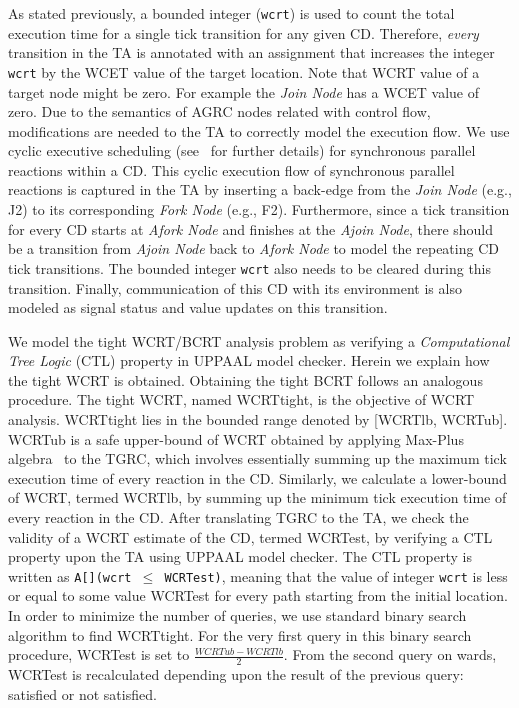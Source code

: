 As stated previously, a bounded integer (\texttt{wcrt}) is used to count
the total execution time for a single tick transition for any given
CD. Therefore, \textit{every} transition in the TA is annotated with an
assignment that increases the integer \texttt{wcrt} by the WCET value of
the target location. Note that WCRT value of a target node might be
zero. For example the \textit{Join Node} has a WCET value of zero. Due
to the semantics of AGRC nodes related with control flow, modifications
are needed to the TA to correctly model the execution flow. We use
cyclic executive scheduling (see~\cite{amal10} for further details) for
synchronous parallel reactions within a CD. This cyclic execution flow
of synchronous parallel reactions is captured in the TA by inserting a
back-edge from the \textit{Join Node} (e.g., J2) to its corresponding
\textit{Fork Node} (e.g., F2). Furthermore, since a tick transition for
every CD starts at \textit{Afork Node} and finishes at the \textit{Ajoin
  Node}, there should be a transition from \textit{Ajoin Node} back to
\textit{Afork Node} to model the repeating CD tick transitions. The
bounded integer \texttt{wcrt} also needs to be cleared during this
transition. Finally, communication of this CD with its environment is
also modeled as signal status and value updates on this transition.

We model the tight WCRT/BCRT analysis problem as verifying a
\textit{Computational Tree Logic} (CTL) property in UPPAAL model
checker. Herein we explain how the tight WCRT is obtained. Obtaining the
tight BCRT follows an analogous procedure. The tight WCRT, named
WCRTtight, is the objective of WCRT analysis. WCRTtight lies in the
bounded range denoted by [WCRTlb, WCRTub]. WCRTub is a safe upper-bound
of WCRT obtained by applying Max-Plus algebra~\cite{boldt07} to the
TGRC, which involves essentially summing up the maximum tick execution
time of every reaction in the CD. Similarly, we calculate a lower-bound
of WCRT, termed WCRTlb, by summing up the minimum tick execution time of
every reaction in the CD. After translating TGRC to the TA, we check the
validity of a WCRT estimate of the CD, termed WCRTest, by verifying a
CTL property upon the TA using UPPAAL model checker. The CTL property is
written as \texttt{A[](wcrt $\leq$ WCRTest)}, meaning that the value of
integer \texttt{wcrt} is less or equal to some value WCRTest for every
path starting from the initial location. In order to minimize the number
of queries, we use standard binary search algorithm to find
WCRTtight. For the very first query in this binary search procedure,
WCRTest is set to $\frac{WCRTub - WCRTlb}{2}$. From the second query on
wards, WCRTest is recalculated depending upon the result of the previous
query: satisfied or not satisfied.




